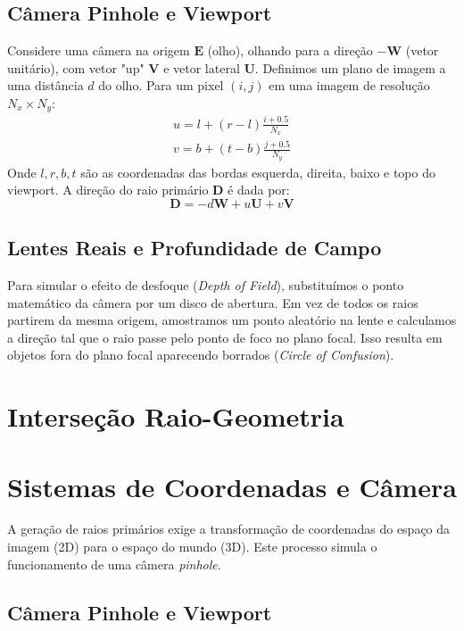 \subsection{Câmera Pinhole e Viewport}

Considere uma câmera na origem $\mathbf{E}$ (olho), olhando para a direção $-\mathbf{W}$ (vetor unitário), com vetor "up" $\mathbf{V}$ e vetor lateral $\mathbf{U}$. Definimos um plano de imagem a uma distância $d$ do olho. Para um pixel $(i, j)$ em uma imagem de resolução $N_x \times N_y$:
\begin{align}
    u = l + (r-l)\frac{i+0.5}{N_x} \\
    v = b + (t-b)\frac{j+0.5}{N_y}
\end{align}
Onde $l, r, b, t$ são as coordenadas das bordas esquerda, direita, baixo e topo do viewport. A direção do raio primário $\mathbf{D}$ é dada por:
\begin{equation}
    \mathbf{D} = -d\mathbf{W} + u\mathbf{U} + v\mathbf{V}
\end{equation}

\subsection{Lentes Reais e Profundidade de Campo}

Para simular o efeito de desfoque (\textit{Depth of Field}), substituímos o ponto matemático da câmera por um disco de abertura. Em vez de todos os raios partirem da mesma origem, amostramos um ponto aleatório na lente e calculamos a direção tal que o raio passe pelo ponto de foco no plano focal. Isso resulta em objetos fora do plano focal aparecendo borrados (\textit{Circle of Confusion}).

\section{Interseção Raio-Geometria}

\section{Sistemas de Coordenadas e Câmera}

A geração de raios primários exige a transformação de coordenadas do espaço da imagem (2D) para o espaço do mundo (3D). Este processo simula o funcionamento de uma câmera \textit{pinhole}.

\subsection{Câmera Pinhole e Viewport}

